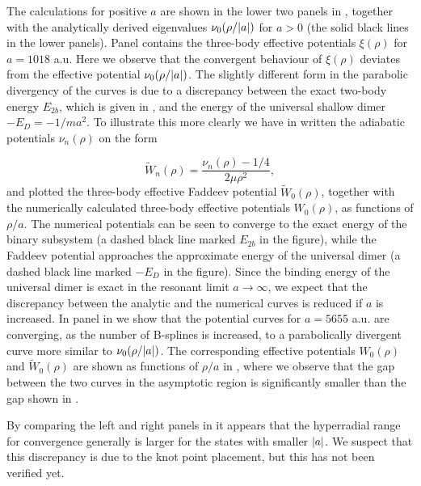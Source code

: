 The calculations for positive $a$ are shown in the lower two panels in , together with the analytically derived eigenvalues $\nu_0(\rho/\lvert a\rvert)$ for $a>0$ (the solid black lines in the lower panels). Panel  contains the three-body effective potentials $\xi(\rho)$ for $a=1018$ a.u. Here we observe that the convergent behaviour of $\xi(\rho)$ deviates from the effective potential $\nu_0(\rho/\lvert a\rvert)$. The slightly different form in the parabolic divergency of the curves is due to a discrepancy between the exact two-body energy $E_{2b}$, which is given in , and the energy of the universal shallow dimer $-E_D=-1/ma^2$. To illustrate this more clearly we have in  written the adiabatic potentials $\nu_{n}(\rho)$ on the form  

\begin{equation}
\widetilde{W}_n(\rho) =\frac{\nu_n(\rho)-1/4}{2\mu \rho^2},
\end{equation}
and plotted the three-body effective Faddeev potential $\widetilde{W}_{0}(\rho)$, together with the numerically calculated three-body effective potentials $W_{0}(\rho)$, as functions of $\rho/a$. The numerical potentials can be seen to converge to the exact energy of the binary subsystem (a dashed black line marked $E_{2b}$ in the figure), while the Faddeev potential approaches the approximate energy of the universal dimer (a dashed black line marked $-E_D$ in the figure). Since the binding energy of the universal dimer is exact in the resonant limit $a \rightarrow \infty$, we expect that the discrepancy between the analytic and the numerical curves is reduced if $a$ is increased. In panel  in  we show that the potential curves for $a=5655$ a.u. are converging, as the number of B-splines is increased, to a parabolically divergent curve more similar to $\nu_0(\rho/\lvert a\rvert)$. The corresponding effective potentials $W_{0}(\rho)$ and $\widetilde{W}_0(\rho)$ are shown as functions of $\rho/a$ in , where we observe that the gap between the two curves in the asymptotic region is significantly smaller than the gap shown in . 

By comparing the left and right panels in  it appears that the hyperradial range for convergence generally is larger for the states with smaller $\lvert a\rvert$. We suspect that this discrepancy is due to the knot point placement, but this has not been verified yet. 

